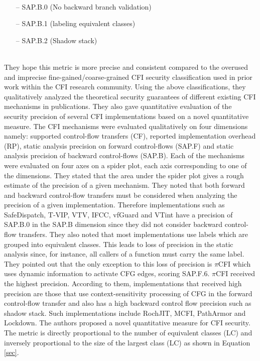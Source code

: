 \documentclass[dvips,12pt]{article}
\begin{document}
\ \\
\begin{itemize}[noitemsep,nolistsep]
\item[--] SAP.B.0  (No backward branch validation)
\item[--] SAP.B.1  (labeling equivalent classes)
\item[--] SAP.B.2  (Shadow stack)
\end{itemize}
\ \\
They hope this metric is more precise and consistent compared to the overused and imprecise fine-gained/coarse-grained CFI security classification used in prior work within the CFI research community.  
\newline
\newline
Using the above classifications, they qualitatively analyzed the theoretical security guarantees of different existing CFI mechanisms in publications. They also gave quantitative evaluation of the security precision of several CFI implementations based on a novel quantitative measure. The CFI mechanisms were evaluated qualitatively on four dimensions namely: supported control-flow transfers (CF), reported implementation overhead (RP), static analysis precision on forward control-flows (SAP.F) and static analysis precision of backward control-flows (SAP.B). Each of the mechanisms were evaluated on four axes on a spider plot, each axis corresponding to one of the dimensions. They stated that the area under the spider plot gives a rough estimate of the precision of a given mechanism. They noted that both forward and backward control-flow transfers must be considered when analyzing the precision of a given implementation. Therefore implementations such as SafeDispatch, T-VIP, VTV, IFCC, vfGuard and VTint have a precision of SAP.B.0 in the SAP.B dimension since they did not consider backward control-flow transfers. They also noted that most implementations use labels which are grouped into equivalent classes. This leads to loss of precision in the static analysis since, for instance, all callers of a function must carry the same label. They pointed out that the only exception to this loss of precision is $\pi$CFI which uses dynamic information to activate CFG edges, scoring SAP.F.6. $\pi$CFI received the highest precision. According to them, implementations that received high precision are those that use context-sensitivity processing of CFG in the forward control-flow transfer and also has a high backward control flow precision such as shadow stack. Such implementations include RochJIT, MCFI, PathArmor and Lockdown. The authors proposed a novel quantitative measure for CFI security. The metric is directly proportional to the number of equivalent classes (LC) and inversely proportional to the size of the largest class (LC) as shown in Equation \ref{sec}. 
\end{document}
